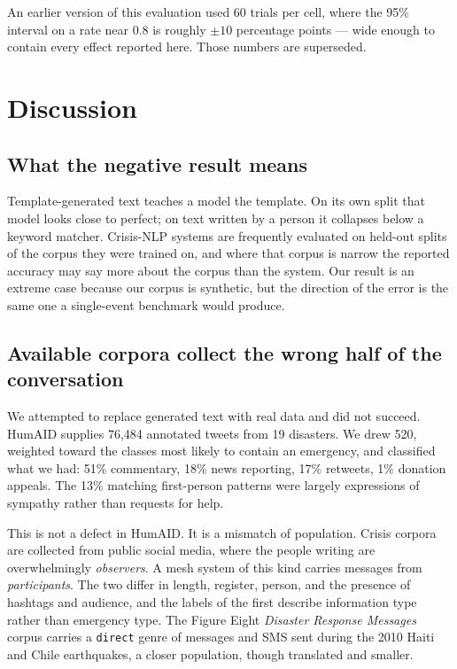 \documentclass[conference]{IEEEtran}
\begin{document}
An earlier version of this evaluation used 60 trials per cell, where the
95\% interval on a rate near 0.8 is roughly $\pm10$ percentage points ---
wide enough to contain every effect reported here. Those numbers are
superseded.

\section{Discussion}

\subsection{What the negative result means}
Template-generated text teaches a model the template. On its own split that
model looks close to perfect; on text written by a person it collapses below a
keyword matcher. Crisis-NLP systems are frequently evaluated on held-out splits
of the corpus they were trained on, and where that corpus is narrow the
reported accuracy may say more about the corpus than the system. Our result is
an extreme case because our corpus is synthetic, but the direction of the error
is the same one a single-event benchmark would produce.

\subsection{Available corpora collect the wrong half of the conversation}
We attempted to replace generated text with real data and did not succeed.
HumAID \cite{humaid} supplies 76{,}484 annotated tweets from 19 disasters. We
drew 520, weighted toward the classes most likely to contain an emergency, and
classified what we had: 51\% commentary, 18\% news reporting, 17\% retweets,
1\% donation appeals. The 13\% matching first-person patterns were largely
expressions of sympathy rather than requests for help.

This is not a defect in HumAID. It is a mismatch of population. Crisis corpora
are collected from public social media, where the people writing are
overwhelmingly \emph{observers}. A mesh system of this kind carries messages
from \emph{participants}. The two differ in length, register, person, and the
presence of hashtags and audience, and the labels of the first describe
information type rather than emergency type. The Figure Eight \emph{Disaster
Response Messages} corpus \cite{drm} carries a \texttt{direct} genre of
messages and SMS sent during the 2010 Haiti and Chile earthquakes, a closer
population, though translated and smaller.
\end{document}
